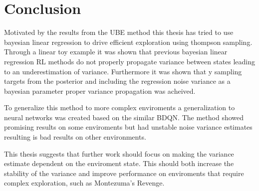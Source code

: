 
\chapter{Conclusion}\label{ch:conc}

Motivated by the results from the UBE method\citep{donoghue_2017} this thesis has tried to use bayesian linear regression to drive efficient exploration using thompson sampling. Through a linear toy example it was shown that previous bayesian linear regression RL methods do not properly propagate variance between states leading to an underestimation of variance. Furthermore  it was shown that y sampling targets from the posterior and including the regression noise variance as a bayesian parameter proper variance propagation was acheived. 

To generalize this method to more complex enviroments a generalization to neural networks was created based on the similar \cite{azziz_2018} BDQN. The method showed promising results on some enviroments but had unstable noise variance estimates resulting is bad results on other environments.

This thesis suggests that further work should focus on making the variance estimate dependent on the enviroment state. This should both increase the stability of the variance and improve performance on enviroments that require complex exploration, such as Montezuma's Revenge.

\cleardoublepage